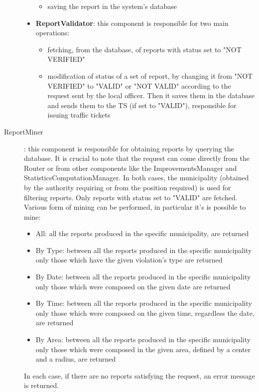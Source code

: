 \begin{description}
\begin{itemize}
\begin{itemize}
								\item saving the report in the system's database
							\end{itemize}
						\item \textbf{ReportValidator}: this component is responsible for two main operations:
							\begin{itemize}
								\item fetching, from the database, of reports with status set to "NOT VERIFIED"
								\item  modification of status of a set of report, by changing it from "NOT VERIFIED" to "VALID" or "NOT VALID" according to the request sent by the local officer. Then it saves them in the database and sends them to the TS (if set to "VALID"), responsible for issuing traffic tickets
							\end{itemize}
					\end{itemize}
				\item[ReportMiner]: this component is responsible for obtaining reports by querying the database. It is crucial to note that the request can come directly from the Router or from other components like the ImprovementsManager and StatisticsComputationManager. In both cases, the municipality (obtained by the authority requiring or from the position required) is used for filtering reports. Only reports with status set to "VALID" are fetched. Various form of mining can be performed, in particular it's is possible to mine:
					\begin{itemize}
						\item All: all the reports produced in the specific municipality, are returned
						\item By Type: between all the reports produced in the specific municipality only those which have the given violation's type are returned 
						\item By Date: between all the reports produced in the specific municipality only those which were composed on the given date are returned
						\item By Time: between all the reports produced in the specific municipality only those which were composed on the given time, regardless the date, are returned
						\item By Area: between all the reports produced in the specific municipality only those which were composed in the given area, defined by a center and a radius, are returned
					\end{itemize}
				In each case, if there are no reports satisfying the request, an error message is returned.

\end{description}
